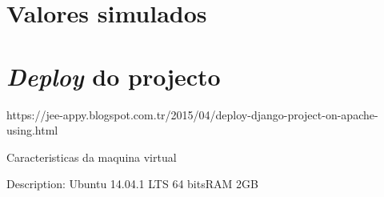 \section{Valores simulados}



\section{\textit{Deploy} do projecto}


https://jee-appy.blogspot.com.tr/2015/04/deploy-django-project-on-apache-using.html

Caracteristicas da maquina virtual

Description:	Ubuntu 14.04.1 LTS
64 bitsRAM 2GB 









